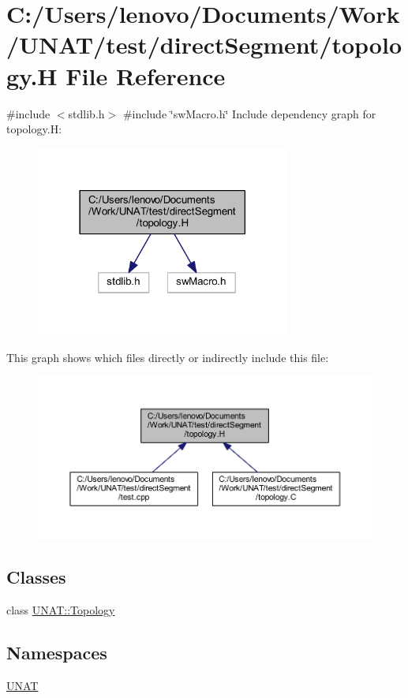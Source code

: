 \hypertarget{test_2directSegment_2topology_8H}{}\section{C\+:/\+Users/lenovo/\+Documents/\+Work/\+U\+N\+A\+T/test/direct\+Segment/topology.H File Reference}
\label{test_2directSegment_2topology_8H}
{\ttfamily \#include $<$stdlib.\+h$>$}\newline
{\ttfamily \#include \char`\"{}sw\+Macro.\+h\char`\"{}}\newline
Include dependency graph for topology.\+H\+:
\nopagebreak
\begin{figure}[H]
\begin{center}
\leavevmode
\includegraphics[width=237pt]{test_2directSegment_2topology_8H__incl}
\end{center}
\end{figure}
This graph shows which files directly or indirectly include this file\+:
\nopagebreak
\begin{figure}[H]
\begin{center}
\leavevmode
\includegraphics[width=350pt]{test_2directSegment_2topology_8H__dep__incl}
\end{center}
\end{figure}
\subsection*{Classes}
\begin{DoxyCompactItemize}
\item 
class \mbox{\hyperlink{classUNAT_1_1Topology}{U\+N\+A\+T\+::\+Topology}}
\end{DoxyCompactItemize}
\subsection*{Namespaces}
\begin{DoxyCompactItemize}
\item 
 \mbox{\hyperlink{namespaceUNAT}{U\+N\+AT}}
\end{DoxyCompactItemize}
